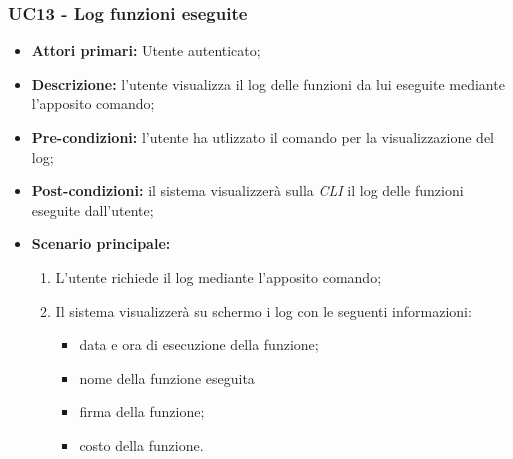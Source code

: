 \subsubsection{UC13 - Log funzioni eseguite}
\begin{itemize}
	\item \textbf{Attori primari:} Utente autenticato;
	\item \textbf{Descrizione:} l'utente visualizza il log delle funzioni da lui eseguite mediante l'apposito comando; 
	\item \textbf{Pre-condizioni:} l'utente ha utlizzato il comando per la visualizzazione del log;
	\item \textbf{Post-condizioni:} il sistema visualizzerà sulla \textit{CLI\glo} il log delle funzioni eseguite dall'utente;
	\item \textbf{Scenario principale:} 
	\begin{enumerate}
		\item L'utente richiede il log mediante l'apposito comando;
		\item Il sistema visualizzerà su schermo i log con le seguenti informazioni:
		\begin{itemize}
			\item data e ora di esecuzione della funzione;
			\item nome della funzione eseguita
			\item firma della funzione;
			\item costo della funzione.
		\end{itemize}
	\end{enumerate}
\end{itemize}